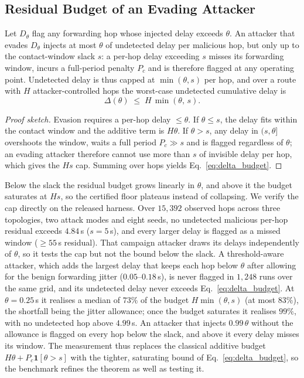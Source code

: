 \subsection{Residual Budget of an Evading Attacker}
\begin{lemma}
\label{lem:residual}
Let $D_\theta$ flag any forwarding hop whose injected delay exceeds $\theta$. An
attacker that evades $D_\theta$ injects at most $\theta$ of undetected delay per
malicious hop, but only up to the contact-window slack $s$: a per-hop delay
exceeding $s$ misses its forwarding window, incurs a full-period penalty
$P_{\!c}$ and is therefore flagged at any operating point. Undetected delay is
thus capped at $\min(\theta,s)$ per hop, and over a route with $H$
attacker-controlled hops the worst-case undetected cumulative delay is
\begin{equation}
\label{eq:delta_budget}
\Delta(\theta) \;\le\; H\,\min(\theta,\,s).
\end{equation}
\end{lemma}
\begin{proof}[Proof sketch]
Evasion requires a per-hop delay $\le\theta$. If $\theta\le s$, the delay fits
within the contact window and the additive term is $H\theta$. If $\theta>s$, any
delay in $(s,\theta]$ overshoots the window, waits a full period
$P_{\!c}\gg s$ and is flagged regardless of $\theta$; an evading attacker
therefore cannot use more than $s$ of invisible delay per hop, which gives the
$Hs$ cap. Summing over hops yields Eq.~\eqref{eq:delta_budget}.
\end{proof}

Below the slack the residual budget grows linearly in $\theta$, and above it the
budget saturates at $Hs$, so the certified floor plateaus instead of
collapsing. We verify the cap directly on the released harness. Over
$15{,}392$ observed hops across three topologies, two attack modes and eight
seeds, no undetected malicious per-hop residual exceeds $4.84$\,s ($s=5$\,s),
and every larger delay is flagged as a missed window ($\ge55$\,s residual). That
campaign attacker draws its delays independently of $\theta$, so it tests the
cap but not the bound below the slack. A threshold-aware attacker, which adds
the largest delay that keeps each hop below $\theta$ after allowing for the
benign forwarding jitter ($0.05$--$0.18$\,s), is never flagged in $1{,}248$ runs
over the same grid, and its undetected delay never exceeds
Eq.~\eqref{eq:delta_budget}. At $\theta=0.25$\,s it realises a median of $73\%$
of the budget $H\min(\theta,s)$ (at most $83\%$), the shortfall being the jitter
allowance; once the budget saturates it realises $99\%$, with no undetected hop
above $4.99$\,s. An attacker that injects $0.99\,\theta$ without the allowance
is flagged on every hop below the slack, and above it every delay misses its
window. The measurement thus replaces the classical additive budget
$H\theta+P_{\!c}\mathbf{1}[\theta>s]$ with the tighter, saturating bound of
Eq.~\eqref{eq:delta_budget}, so the benchmark refines the theorem as well as
testing it.

